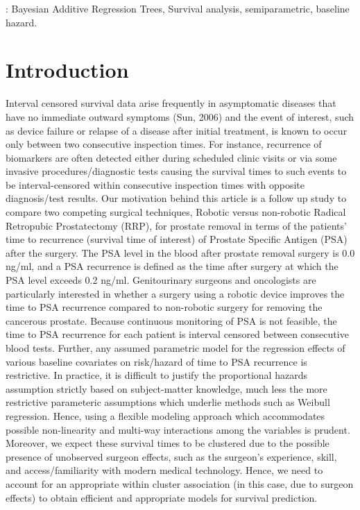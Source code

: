 \documentclass[11pt]{article}
\begin{document}
: Bayesian Additive Regression Trees, Survival analysis, semiparametric, baseline hazard.
\thispagestyle{empty}
\vspace{.5in}

\newpage
\clearpage
\setcounter{page}{1}
\setlength{\baselineskip}{2em}
\section{Introduction}
Interval censored survival data arise frequently in asymptomatic diseases that have no immediate outward symptoms (Sun, 2006) and the event of interest, such as device failure or relapse of a disease after initial treatment, is known to occur only between two consecutive inspection times. For instance, recurrence of biomarkers are often detected either during scheduled clinic visits or via some invasive procedures/diagnostic tests causing the survival times to such events to be interval-censored within consecutive inspection times with opposite diagnosis/test results. Our motivation behind this article is a follow up study to compare two competing surgical techniques, Robotic versus non-robotic Radical Retropubic Prostatectomy (RRP), for prostate removal in terms of the patients' time to recurrence (survival time of interest) of Prostate Specific Antigen (PSA) after the surgery. The PSA level in the blood after prostate removal surgery is 0.0 ng/ml, and a PSA recurrence is defined as the time after surgery at which the PSA level exceeds 0.2 ng/ml. Genitourinary surgeons and oncologists are particularly interested in whether a surgery using a robotic device improves the time to PSA recurrence compared to non-robotic surgery for removing the cancerous prostate. Because continuous monitoring of PSA is not feasible, the time to PSA recurrence for each patient is interval censored between consecutive blood tests. 
\color{red}
Further, any assumed parametric model for the regression effects of various baseline covariates on risk/hazard of time to PSA recurrence is restrictive. In practice, it is difficult to justify the proportional hazards assumption strictly based on subject-matter knowledge, much less the more restrictive parameteric assumptions which underlie methods such as Weibull regression.
\normalcolor
Hence, using a flexible modeling approach which accommodates possible non-linearity and multi-way interactions among the variables is prudent. Moreover, we expect these survival times to be clustered due to the possible presence of unobserved surgeon effects, such as the surgeon's experience, skill, and access/familiarity with modern medical technology. Hence, we need to account for an appropriate within cluster association (in this case, due to surgeon effects) to obtain efficient and appropriate models for survival prediction.
 
\end{document}
